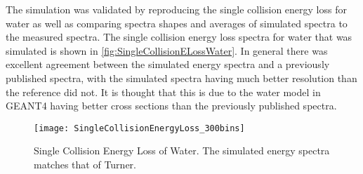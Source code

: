 The simulation was validated by reproducing the single collision energy loss for water as well as comparing spectra shapes and averages of simulated spectra to the measured spectra.
The single collision energy loss spectra for water that was simulated is shown in \autoref{fig:SingleCollisionELossWater}.
In general there was excellent agreement between the simulated energy spectra and a previously published spectra\cite{turner_comparative_1982}, with the simulated spectra having much better resolution than the reference did not.
It is thought that this is due to the water model in GEANT4 having better cross sections than the previously published spectra.
\begin{figure}[ht]
  \centering
  \texttt{[image: SingleCollisionEnergyLoss\_300bins]}
  \caption{Single Collision Energy Loss of Water. The simulated energy spectra matches that of Turner\cite{turner_comparative_1982}.}
	\label{fig:SingleCollisionELossWater}
\end{figure}

